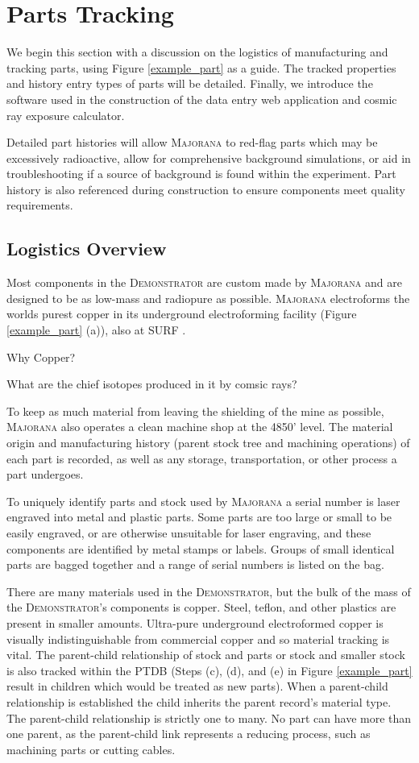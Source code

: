 \documentclass[journal]{IEEEtran}
\begin{document}
\section{Parts Tracking}
We begin this section with a discussion on the logistics of manufacturing and tracking parts, using Figure \ref{example_part}
as a guide. The tracked properties and history entry types of parts will be detailed. Finally, we introduce the
software used in the construction of the data entry web application and cosmic ray exposure calculator.

Detailed part histories will allow \textsc{Majorana}
to red-flag parts which may be excessively radioactive, allow for comprehensive background simulations,
or aid in troubleshooting if a source of background is found within the experiment.
Part history is also referenced during construction to ensure components meet quality requirements.

\subsection{Logistics Overview}
Most components in the \textsc{Demonstrator} are custom made by \textsc{Majorana} and are designed
to be as low-mass and radiopure as possible. 
\textsc{Majorana} electroforms the worlds purest copper in its underground electroforming facility (Figure \ref{example_part} (a)), also at SURF \cite{mj_wilkerson}.

Why Copper?

What are the chief isotopes produced in it by comsic rays?

To keep as much material from leaving the shielding of the mine as possible, \textsc{Majorana} also operates a clean 
machine shop at the 4850' level. The material origin and manufacturing history (parent stock tree and machining operations) 
of each part is recorded, as well as any storage, transportation, or other process a part undergoes.

To uniquely identify parts and stock used by \textsc{Majorana} a serial number is laser engraved into metal and plastic parts.
Some parts are too large or small to be easily engraved, or are otherwise unsuitable for laser engraving, and these
components are identified by metal stamps or labels. Groups of small identical parts are bagged together
and a range of serial numbers is listed on the bag.

There are many materials used in the \textsc{Demonstrator}, but the bulk of the mass of the \textsc{Demonstrator}'s components is copper.
Steel, teflon, and other plastics are present in smaller amounts. 
Ultra-pure underground electroformed copper is visually indistinguishable from commercial copper and so material
tracking is vital.
The parent-child relationship of stock and parts or stock and smaller stock is also tracked
within the PTDB (Steps (c), (d), and (e) in Figure \ref{example_part} result in children which would be treated as new parts).
When a parent-child relationship is established the child inherits the parent record's material type. 
The parent-child relationship is strictly one to many. No part can have more than one parent, as the parent-child link
represents a reducing process, such as machining parts or cutting cables. 
\end{document}
